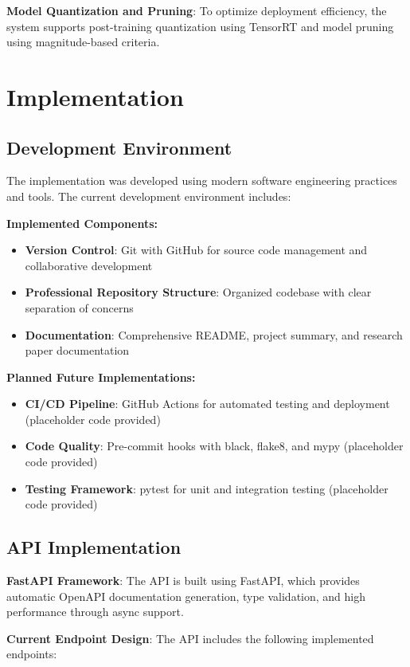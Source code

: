 \documentclass[12pt,a4paper]{article}
\begin{document}
\textbf{Model Quantization and Pruning}: To optimize deployment efficiency, the system supports post-training quantization using TensorRT and model pruning using magnitude-based criteria.

\section{Implementation}

\subsection{Development Environment}

The implementation was developed using modern software engineering practices and tools. The current development environment includes:

\textbf{Implemented Components:}
\begin{itemize}
    \item \textbf{Version Control}: Git with GitHub for source code management and collaborative development
    \item \textbf{Professional Repository Structure}: Organized codebase with clear separation of concerns
    \item \textbf{Documentation}: Comprehensive README, project summary, and research paper documentation
\end{itemize}

\textbf{Planned Future Implementations:}
\begin{itemize}
    \item \textbf{CI/CD Pipeline}: GitHub Actions for automated testing and deployment (placeholder code provided)
    \item \textbf{Code Quality}: Pre-commit hooks with black, flake8, and mypy (placeholder code provided)
    \item \textbf{Testing Framework}: pytest for unit and integration testing (placeholder code provided)
\end{itemize}

\subsection{API Implementation}

\textbf{FastAPI Framework}: The API is built using FastAPI, which provides automatic OpenAPI documentation generation, type validation, and high performance through async support.

\textbf{Current Endpoint Design}: The API includes the following implemented endpoints:
\end{document}
